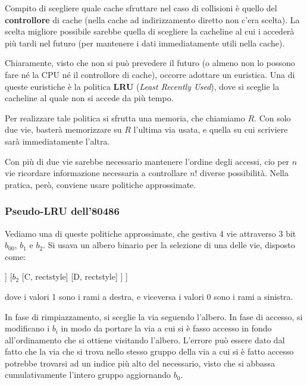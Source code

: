 \documentclass[a4paper,11pt]{article}
\begin{document}
Compito di scegliere quale cache sfruttare nel caso di collisioni è quello del \textbf{controllore} di cache (nella cache ad indirizzamento diretto non c'era scelta). 
La scelta migliore possibile sarebbe quella di scegliere la cacheline al cui i accederà più tardi nel futuro (per mantenere i dati immediatamente utili nella cache).

Chiaramente, visto che non si può prevedere il futuro (o almeno non lo possono fare né la CPU né il controllore di cache), occorre adottare un euristica.
Una di queste euristiche è la politica \textbf{LRU} (\textit{Least Recently Used}), dove si sceglie la cacheline al quale non si accede da più tempo.

Per realizzare tale politica si sfrutta una memoria, che chiamiamo $R$.
Con solo due vie, basterà memorizzare su $R$ l'ultima via usata, e quella su cui scriviere sarà immediatamente l'altra.

Con più di due vie sarebbe necessario mantenere l'ordine degli accessi, cio per $n$ vie ricordare informazione necessaria a controllare $n!$ diverse possibilità.
Nella pratica, però, conviene usare politiche approssimate.

\subsubsection{Pseudo-LRU dell'80486}
Vediamo una di queste politiche approssimate, che gestiva 4 vie attraverso 3 bit $b_00$, $b_1$ e $b_2$.
Si usava un albero binario per la selezione di una delle vie, disposto come:
\begin{center}
	\begin{forest}
		[$b_0$, roundstyle
			[$b_1$
				[A, rectstyle]
				[B, rectstyle]
				]
			[$b_2$
				[C, rectstyle]
				[D, rectstyle]
			]
		]	
	\end{forest}
\end{center}
dove i valori 1 sono i rami a destra, e viceversa i valori 0 sono i rami a sinistra.

In fase di rimpiazzamento, si sceglie la via seguendo l'albero.
In fase di accesso, si modificano i $b_i$ in modo da portare la via a cui si è fasso accesso in fondo all'ordinamento che si ottiene visitando l'albero.
L'errore può essere dato dal fatto che la via che si trova nello stesso gruppo della via a cui si è fatto accesso potrebbe trovarsi ad un indice più alto del necessario, visto che si abbassa cumulativamente l'intero gruppo aggiornando $b_0$.

\par\smallskip
\end{document}
